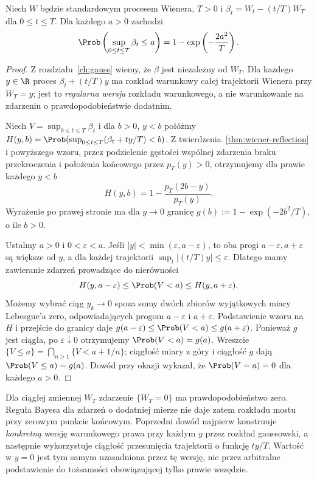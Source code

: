\begin{wniosek}
Niech $W$ będzie standardowym procesem Wienera,
$T>0$ i $\beta_t=W_t-(t/T)W_T$ dla $0\le t\le T$.
Dla każdego $a>0$ zachodzi
\[
\Prob\left(\sup_{0\le t\le T}\beta_t\le a\right)
=1-\exp\left(-\frac{2a^2}{T}\right).
\]
\end{wniosek}
\begin{proof}
Z rozdziału~\ref{ch:gauss} wiemy, że $\beta$ jest
niezależny od $W_T$. Dla każdego $y\in\R$ proces
$\beta_t+(t/T)y$ ma rozkład warunkowy całej trajektorii
Wienera przy $W_T=y$; jest to \emph{regularna wersja}
rozkładu warunkowego, a nie warunkowanie na zdarzeniu o
prawdopodobieństwie dodatnim.

Niech $V=\sup_{0\le t\le T}\beta_t$ i dla $b>0$, $y<b$ połóżmy
$H(y,b)=\Prob(\sup_{0\le t\le T}(\beta_t+ty/T)<b)$.
Z twierdzenia~\ref{thm:wiener-reflection} i powyższego wzoru,
przez podzielenie gęstości
wspólnej zdarzenia braku przekroczenia i położenia końcowego
przez $p_T(y)>0$, otrzymujemy dla prawie każdego $y<b$
\[
H(y,b)=1-\frac{p_T(2b-y)}{p_T(y)}.
\]
Wyrażenie po prawej stronie ma dla $y\to0$ granicę
$g(b):=1-\exp(-2b^2/T)$, o ile $b>0$.

Ustalmy $a>0$ i $0<\varepsilon<a$. Jeśli $|y|<\min(\varepsilon,a-\varepsilon)$,
to oba progi $a-\varepsilon,a+\varepsilon$ są większe
od $y$, a dla każdej trajektorii $\sup_t|(t/T)y|\le\varepsilon$.
Dlatego mamy zawieranie zdarzeń prowadzące do nierówności
\[
H(y,a-\varepsilon)\le\Prob(V<a)
\le H(y,a+\varepsilon).
\]
Możemy wybrać ciąg $y_k\to0$ spoza sumy dwóch zbiorów
wyjątkowych miary Lebesgue'a zero, odpowiadających progom
$a-\varepsilon$ i $a+\varepsilon$. Podstawienie wzoru
na $H$ i przejście do granicy daje
$g(a-\varepsilon)\le\Prob(V<a)\le g(a+\varepsilon)$.
Ponieważ $g$ jest ciągła, po $\varepsilon\downarrow0$
otrzymujemy $\Prob(V<a)=g(a)$. Wreszcie
$\{V\le a\}=\bigcap_{n\ge1}\{V<a+1/n\}$;
ciągłość miary z góry i ciągłość $g$ dają
$\Prob(V\le a)=g(a)$. Dowód przy okazji wykazał,
że $\Prob(V=a)=0$ dla każdego $a>0$.
\end{proof}


\begin{uwaga}
Dla ciągłej zmiennej $W_T$ zdarzenie $\{W_T=0\}$ ma
prawdopodobieństwo zero. Reguła Bayesa dla zdarzeń o dodatniej
mierze nie daje zatem rozkładu mostu przy zerowym punkcie
końcowym. Poprzedni dowód najpierw konstruuje \emph{konkretną}
wersję warunkowego prawa przy każdym $y$ przez rozkład
gaussowski, a następnie wykorzystuje ciągłość przesunięcia
trajektorii o funkcję $ty/T$. Wartość w $y=0$ jest tym
samym uzasadniona przez tę wersję, nie przez arbitralne
podstawienie do tożsamości obowiązującej tylko prawie wszędzie.
\end{uwaga}

